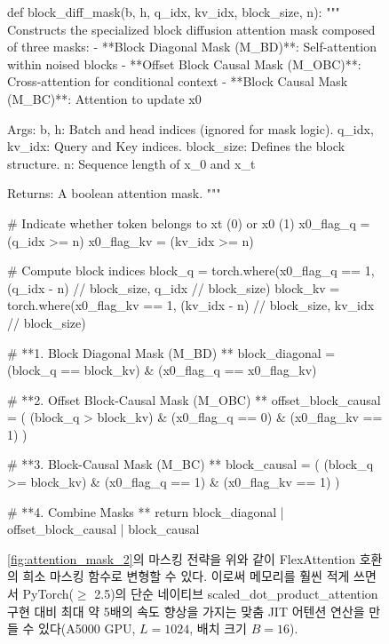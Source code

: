 \documentclass{article} %
\begin{document}
\begin{figure}
    \centering
    
\begin{minipage}{\linewidth}
\begin{python}
def block_diff_mask(b, h, q_idx, kv_idx, block_size, n):
    """
    Constructs the specialized block diffusion attention mask composed of three masks:
    - **Block Diagonal Mask (M_BD)**: Self-attention within noised blocks
    - **Offset Block Causal Mask (M_OBC)**: Cross-attention for conditional context
    - **Block Causal Mask (M_BC)**: Attention to update x0
    
    Args:
      b, h: Batch and head indices (ignored for mask logic).
      q_idx, kv_idx: Query and Key indices.
      block_size: Defines the block structure.
      n: Sequence length of x_0 and x_t

    
    Returns:
      A boolean attention mask.
    """
    
    # Indicate whether token belongs to xt (0) or x0 (1)
    x0_flag_q = (q_idx >= n)
    x0_flag_kv = (kv_idx >= n)
    
    # Compute block indices
    block_q = torch.where(x0_flag_q == 1,
                        (q_idx - n) // block_size,
                        q_idx // block_size)
    block_kv = torch.where(x0_flag_kv == 1,
                        (kv_idx - n) // block_size,
                        kv_idx // block_size)
    
    # **1. Block Diagonal Mask (M_BD) **
    block_diagonal = (block_q == block_kv) & (x0_flag_q == x0_flag_kv)
    
    # **2. Offset Block-Causal Mask (M_OBC) **
    offset_block_causal = (
        (block_q > block_kv)
        & (x0_flag_q == 0)
        & (x0_flag_kv == 1)
    )
    
    # **3. Block-Causal Mask (M_BC) **
    block_causal = (
        (block_q >= block_kv)
        & (x0_flag_q == 1)
        & (x0_flag_kv == 1)
    )
    
    # **4. Combine Masks **
    return block_diagonal | offset_block_causal | block_causal
    
\end{python}
\label{py::flex-attention}
\end{minipage}
    \caption{\cref{fig:attention_mask_2}의 마스킹 전략을 위와 같이 FlexAttention 호환의 희소 마스킹 함수로 변형할 수 있다. 이로써 메모리를 훨씬 적게 쓰면서 PyTorch($\geq$ 2.5)의 단순 네이티브 scaled\_dot\_product\_attention 구현 대비 최대 약 5배의 속도 향상을 가지는 맞춤 JIT 어텐션 연산을 만들 수 있다(A5000 GPU, $L=1024$, 배치 크기 $B=16$).}
    \label{fig:flex-attn-mask}
\end{figure}
\end{document}
